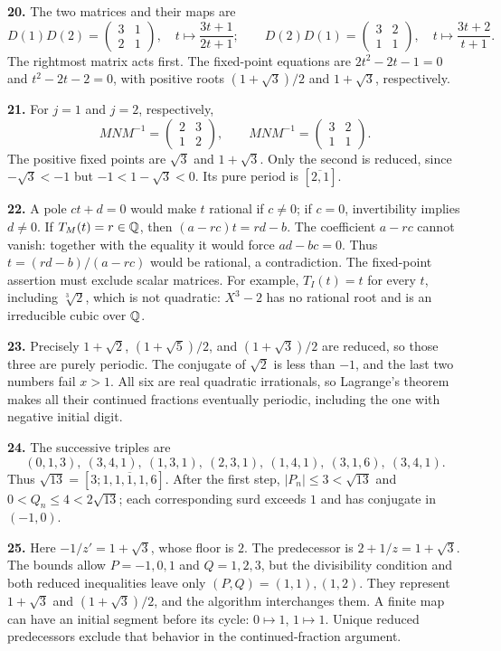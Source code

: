 \textbf{20.} The two matrices and their maps are
\[
 D(1)D(2)=\begin{pmatrix}3&1\\2&1\end{pmatrix},
 \quad t\longmapsto\frac{3t+1}{2t+1};
 \qquad
 D(2)D(1)=\begin{pmatrix}3&2\\1&1\end{pmatrix},
 \quad t\longmapsto\frac{3t+2}{t+1}.
\]
The rightmost matrix acts first. The fixed-point equations are
$2t^2-2t-1=0$ and $t^2-2t-2=0$, with positive roots
$(1+\sqrt3)/2$ and $1+\sqrt3$, respectively.

\textbf{21.} For $j=1$ and $j=2$, respectively,
\[
 MNM^{-1}
 =\begin{pmatrix}2&3\\1&2\end{pmatrix},
 \qquad
 MNM^{-1}
 =\begin{pmatrix}3&2\\1&1\end{pmatrix}.
\]
The positive fixed points are $\sqrt3$ and $1+\sqrt3$.
Only the second is reduced, since $-\sqrt3<-1$ but
$-1<1-\sqrt3<0$. Its pure period is $[\overline{2,1}]$.

\textbf{22.} A pole $ct+d=0$ would make $t$ rational if $c\ne0$;
if $c=0$, invertibility implies $d\ne0$. If $T_M(t)=r\in\mathbb Q$,
then $(a-rc)t=rd-b$. The coefficient $a-rc$ cannot vanish:
together with the equality it would force $ad-bc=0$.
Thus $t=(rd-b)/(a-rc)$ would be rational, a contradiction.
The fixed-point assertion must exclude scalar matrices.
For example, $T_I(t)=t$ for every $t$, including $\sqrt[3]{2}$,
which is not quadratic: $X^3-2$ has no rational root and is an
irreducible cubic over $\mathbb Q$.

\textbf{23.} Precisely $1+\sqrt2$, $(1+\sqrt5)/2$, and
$(1+\sqrt3)/2$ are reduced, so those three are purely periodic.
The conjugate of $\sqrt2$ is less than $-1$, and the last two
numbers fail $x>1$. All six are real quadratic irrationals, so
Lagrange's theorem makes all their continued fractions eventually
periodic, including the one with negative initial digit.

\textbf{24.} The successive triples are
\[
 (0,1,3),\ (3,4,1),\ (1,3,1),\ (2,3,1),\
 (1,4,1),\ (3,1,6),\ (3,4,1).
\]
Thus $\sqrt{13}=[3;\overline{1,1,1,1,6}]$.
After the first step, $|P_n|\le3<\sqrt{13}$ and
$0<Q_n\le4<2\sqrt{13}$; each corresponding surd exceeds $1$
and has conjugate in $(-1,0)$.

\textbf{25.} Here $-1/z'=1+\sqrt3$, whose floor is $2$.
The predecessor is $2+1/z=1+\sqrt3$.
The bounds allow $P=-1,0,1$ and $Q=1,2,3$, but the
divisibility condition and both reduced inequalities leave only
$(P,Q)=(1,1),(1,2)$. They represent $1+\sqrt3$ and
$(1+\sqrt3)/2$, and the algorithm interchanges them.
A finite map can have an initial segment before its cycle:
$0\mapsto1$, $1\mapsto1$. Unique reduced predecessors exclude
that behavior in the continued-fraction argument.

